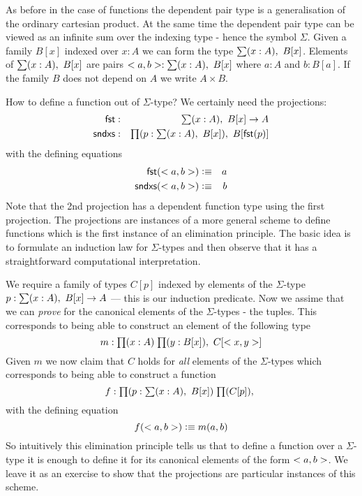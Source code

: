 {As before in the case of functions the dependent pair type is a
generalisation of the ordinary cartesian product. At the same time 
the dependent pair type can be viewed as an infinite sum over the
indexing type - hence  the symbol $\Sigma$. Given a family $B[x]$
indexed over $x:A$ we can form the type $\sm{x:A}B[x]$. Elements of $\sm{x:A}B[x]$ are
pairs $\tup{a}{b} : \sm{x:A}B[x]$ where $a:A$ and $b:B[a]$. If the
family $B$ does not depend on $A$ we write $A \times B$.

How to define a function out of $\Sigma$-type? We certainly need the projections:
\begin{eqnarray*}
  \fst & : & \sm{x : A}B[x] \to A \\
  \snd & : & \prd{p:\sm{x : A}B[x]}B[\fst(p)]
\end{eqnarray*}
with the defining equations 
\begin{eqnarray*}
  \mathsf{fst}(<a,b>) & \vcentcolon\equiv & a \\
  \mathsf{sndxs}(<a,b>) & \vcentcolon\equiv & b
\end{eqnarray*}
Note that the 2nd projection has a dependent function type using the
first projection. The projections are instances of a more general
scheme to define functions which is the first instance of an
elimination principle. The basic idea is to formulate an induction law
for $\Sigma$-types and then observe that it has a straightforward
computational interpretation.

We require a family of types $C[p]$ indexed by elements of the
$\Sigma$-type $p : \sm{x : A}B[x] \to A$ --- this is our induction
predicate. Now we assime that we can \emph{prove} for the canonical
elements of the $\Sigma$-types - the tuples. This corresponds to being
able to construct an element of the following type
\[ m:\prd{x:A}{y:B[x]}C[\tup{x}{y}] \]
Given $m$ we now claim that $C$ holds for \emph{all} elements of the
$\Sigma$-types which corresponds to being able to construct a function 
\[ f : \prd{p:\sm{x : A}B[x]}{C[p]}\]
with the defining equation
\[ f(<a,b>) \vcentcolon\equiv m(a,b) \]
So intuitively this elimination principle tells us that to define a
function over a $\Sigma$-type it is enough to define it for its
canonical elements of the form $<a,b>$. We leave it as an
exercise to show that the projections are particular instances of this
scheme. 


}
